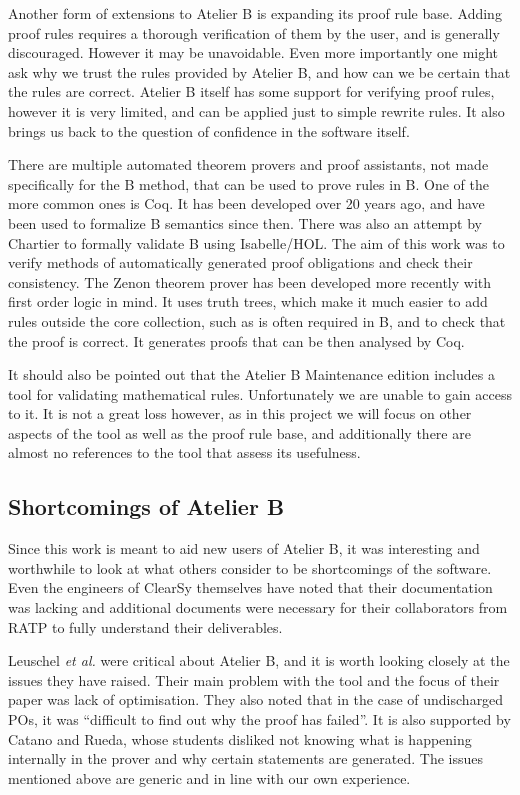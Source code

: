 \documentclass[12pt,journal,duplex]{IEEEtran}
\begin{document}
	Another form of extensions to Atelier B is expanding its proof rule base. Adding proof rules requires a thorough verification of them by the user, and is generally discouraged. However it may be unavoidable. Even more importantly one might ask why we trust the rules provided by Atelier B, and how can we be certain that the rules are correct. Atelier B itself has some support for verifying proof rules, however it is very limited, and can be applied just to simple rewrite rules. It also brings us back to the question of confidence in the software itself.
	
	There are multiple automated theorem provers and proof assistants, not made specifically for the B method, that can be used to prove rules in B. One of the more common ones is Coq. It has been developed over 20 years ago, and have been used to formalize B semantics since then\cite{Coq and PVS}. There was also an attempt by Chartier to formally validate B using Isabelle/HOL\cite{Isabelle}. The aim of this work was to verify methods of automatically generated proof obligations and check their consistency. The Zenon theorem prover has been developed more recently with first order logic in mind\cite{Zenon}. It uses truth trees, which make it much easier to add rules outside the core collection, such as is often required in B, and to check that the proof is correct. It generates proofs that can be then analysed by Coq.
	
	It should also be pointed out that the Atelier B Maintenance edition includes a tool for validating mathematical rules. Unfortunately we are unable to gain access to it. It is not a great loss however, as in this project we will focus on other aspects of the tool as well as the proof rule base, and additionally there are almost no references to the tool that assess its usefulness.
	
	\subsection{Shortcomings of Atelier B}
	
	
	Since this work is meant to aid new users of Atelier B, it was interesting and worthwhile to look at what others consider to be shortcomings of the software. Even the engineers of ClearSy themselves have noted that their documentation was lacking and additional documents were necessary for their collaborators from RATP to fully understand their deliverables\cite{screen doors}.

	Leuschel \emph{et al.} were critical about Atelier B, and it is worth looking closely at the issues they have raised. Their main problem with the tool and the focus of their paper was lack of optimisation. They also noted that in the case of undischarged POs, it was ``difficult to find out why the proof has failed''. It is also supported by Catano and Rueda, whose students disliked not knowing what is happening internally in the prover and why certain statements are generated. The issues mentioned above are generic and in line with our own experience.
\end{document}
